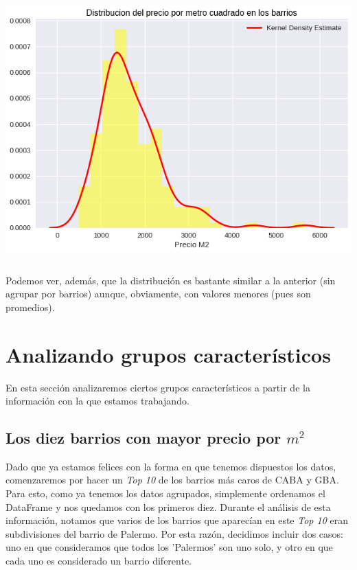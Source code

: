 \documentclass[a4paper, 10pt]{article}
\newcommand\tab[1][0.5cm]{\hspace*{#1}}
\begin{document}
				\begin{center}
   	    				\includegraphics[width=6in, height=4in]{images/m2HoodHistogram}
			    \end{center}	
			    \tab Podemos ver, además, que la distribución es bastante similar a la anterior (sin agrupar por barrios) aunque,
			    obviamente, con valores menores (pues son promedios).
		\section{Analizando grupos característicos}
			En esta sección analizaremos ciertos grupos característicos a partir de la información con la que estamos trabajando.
			\subsection{Los diez barrios con mayor precio por $m^2$}
				Dado que ya estamos felices con la forma en que tenemos dispuestos los datos, comenzaremos por hacer un
				\emph{Top 10} de los barrios más caros de CABA y GBA. \\
				\tab Para esto, como ya tenemos los datos agrupados, simplemente ordenamos el DataFrame y nos quedamos con
				los primeros diez.
				\tab Durante el análisis de esta información, notamos que varios de los barrios que aparecían en este \emph{Top 10}
				eran subdivisiones del barrio de Palermo. Por esta razón, decidimos incluir dos casos: uno en que consideramos
				que todos los 'Palermos' son uno solo, y otro en que cada uno es considerado un barrio diferente.
\end{document}
